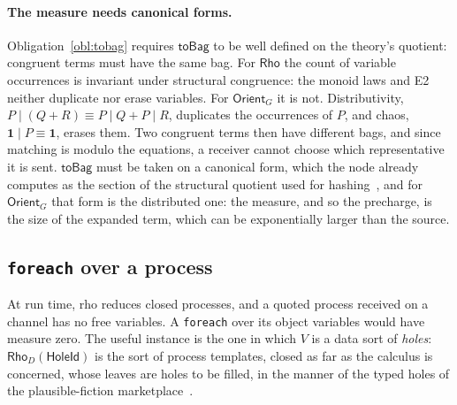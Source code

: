 \documentclass[11pt]{article}
\theoremstyle{definition}
\theoremstyle{plain}
\theoremstyle{remark}
\newcommand{\rhoc}{\textsf{rho}}
\newcommand{\chaos}{\mathbf{1}}
\newcommand{\fe}{\texttt{foreach}}
\begin{document}
\paragraph{The measure needs canonical forms.} Obligation~\ref{obl:tobag}
requires \(\mathsf{toBag}\) to be well defined on the theory's quotient:
congruent terms must have the same bag. For \(\mathsf{Rho}\) the count of
variable occurrences is invariant under structural congruence: the monoid laws
and E2 neither duplicate nor erase variables. For \(\mathsf{Orient}_G\) it is
not. Distributivity, \(P\mid(Q+R)\equiv P\mid Q + P\mid R\), duplicates the
occurrences of \(P\), and chaos, \(\chaos\mid P\equiv\chaos\), erases them. Two
congruent terms then have different bags, and since matching is modulo the
equations, a receiver cannot choose which representative it is sent.
\(\mathsf{toBag}\) must be taken on a canonical form, which the node already
computes as the section of the structural quotient used for
hashing~\cite{f1r3nodeOTE}, and for \(\mathsf{Orient}_G\) that form is the
distributed one: the measure, and so the precharge, is the size of the expanded
term, which can be exponentially larger than the source.

\subsection{\texttt{foreach} over a process}

At run time, \rhoc{} reduces closed processes, and a quoted process received on
a channel has no free variables. A \fe{} over its object variables would have
measure zero. The useful instance is the one in which \(V\) is a data sort of
\emph{holes}: \(\mathsf{Rho}_D(\mathsf{HoleId})\) is the sort of process
templates, closed as far as the calculus is concerned, whose leaves are holes
to be filled, in the manner of the typed holes of the plausible-fiction
marketplace~\cite{PF}.
\end{document}
